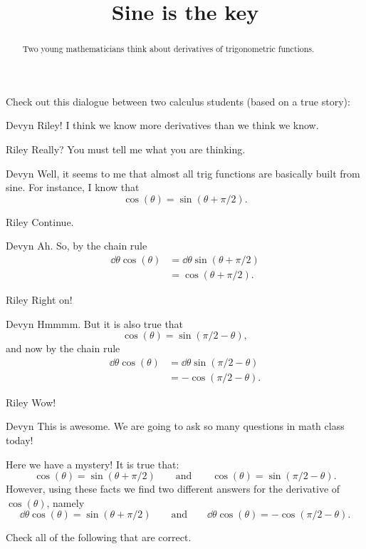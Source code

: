 \documentclass{ximera}
\title[Break-Ground:]{Sine is the key}
\begin{document}
\begin{abstract}
Two young mathematicians think about derivatives of trigonometric functions.
\end{abstract}
\maketitle

Check out this dialogue between two calculus students (based on a true
story):

\begin{dialogue}
\item[Devyn] Riley! I think we know more derivatives than we think we know.
\item[Riley] Really? You must tell me what you are thinking.
\item[Devyn] Well, it seems to me that almost all trig functions are
  basically built from sine. For instance, I know that 
  \[
  \cos(\theta)  = \sin(\theta + \pi/2).
  \]
\item[Riley] Continue.
\item[Devyn] Ah. So, by the chain rule
  \begin{align*}
  \dd{\theta}\cos(\theta) &= \dd{\theta} \sin(\theta + \pi/2)\\
  &=\cos(\theta + \pi/2).
  \end{align*}
\item[Riley] Right on!
\item[Devyn] Hmmmm. But it is also true that
  \[
  \cos(\theta) = \sin(\pi/2 - \theta), 
  \]
  and now by the chain rule
  \begin{align*}
  \dd{\theta}\cos(\theta) &= \dd{\theta}\sin(\pi/2-\theta)\\
  &=-\cos(\pi/2 - \theta).
  \end{align*}
\item[Riley] Wow!
\item[Devyn] This is awesome. We are going to ask so many questions in
  math class today!
\end{dialogue}

Here we have a mystery! It is true that:
\[
\cos(\theta)  = \sin(\theta + \pi/2) \qquad\text{and}\qquad\cos(\theta) = \sin(\pi/2 - \theta).
\]
However, using these facts we find two different answers for the derivative of $\cos(\theta)$, namely
\[
\dd{\theta} \cos(\theta) = \sin(\theta + \pi/2) \qquad\text{and}\qquad\dd{\theta}\cos(\theta) =-\cos(\pi/2 - \theta).
\]

\begin{problem}
  Check all of the following that are correct.
  \begin{multipleResponse}
  \end{multipleResponse}
\end{problem}
\end{document}

